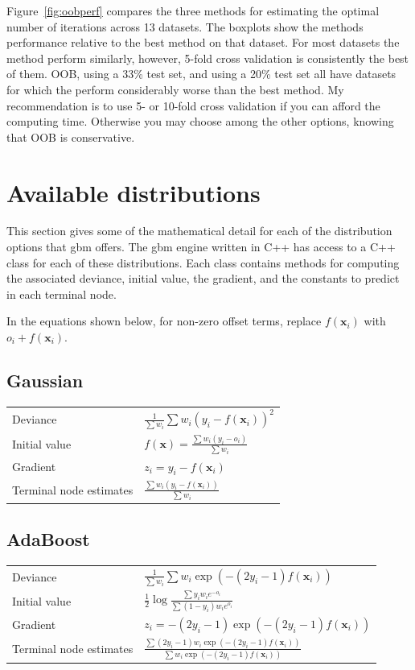 \documentclass{article}
\begin{document}
Figure~\ref{fig:oobperf} compares the three methods for estimating the optimal number of iterations across 13 datasets. The boxplots show the methods performance relative to the best method on that dataset. For most datasets the method perform similarly, however, 5-fold cross validation is consistently the best of them. OOB, using a 33\% test set, and using a 20\% test set all have datasets for which the perform considerably worse than the best method. My recommendation is to use 5- or 10-fold cross validation if you can afford the computing time. Otherwise you may choose among the other options, knowing that OOB is conservative.

\section{Available distributions}

This section gives some of the mathematical detail for each of the distribution options that gbm offers. The gbm engine written in C++ has access to a C++ class for each of these distributions. Each class contains methods for computing the associated deviance, initial value, the gradient, and the constants to predict in each terminal node.

In the equations shown below, for non-zero offset terms, replace $f(\mathbf{x}_i)$ with $o_i + f(\mathbf{x}_i)$.

\subsection{Gaussian}

\begin{tabular}{ll}
Deviance & $\displaystyle \frac{1}{\sum w_i} \sum w_i(y_i-f(\mathbf{x}_i))^2$ \\
Initial value & $\displaystyle f(\mathbf{x})=\frac{\sum w_i(y_i-o_i)}{\sum w_i}$ \\
Gradient & $z_i=y_i - f(\mathbf{x}_i)$ \\
Terminal node estimates & $\displaystyle \frac{\sum w_i(y_i-f(\mathbf{x}_i))}{\sum w_i}$
\end{tabular}

\subsection{AdaBoost}

\begin{tabular}{ll}
Deviance & $\displaystyle \frac{1}{\sum w_i} \sum w_i\exp(-(2y_i-1)f(\mathbf{x}_i))$ \\
Initial value & $\displaystyle \frac{1}{2}\log\frac{\sum y_iw_ie^{-o_i}}{\sum (1-y_i)w_ie^{o_i}}$ \\
Gradient & $\displaystyle z_i= -(2y_i-1)\exp(-(2y_i-1)f(\mathbf{x}_i))$ \\
Terminal node estimates &
$\displaystyle \frac{\sum (2y_i-1)w_i\exp(-(2y_i-1)f(\mathbf{x}_i))}
      {\sum w_i\exp(-(2y_i-1)f(\mathbf{x}_i))}$
\end{tabular}
\end{document}
